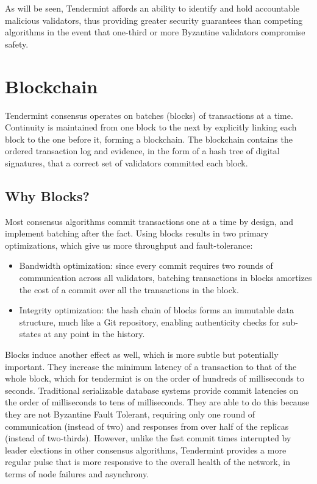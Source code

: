As will be seen, Tendermint affords an ability to identify and hold accountable malicious validators, thus providing greater security guarantees than competing algorithms in the event that one-third or more Byzantine validators compromise safety.

\section{Blockchain}

Tendermint consensus operates on batches (blocks) of transactions at a time.
Continuity is maintained from one block to the next by explicitly linking each block to the one before it,
forming a blockchain. 
The blockchain contains the ordered transaction log and evidence,
in the form of a hash tree of digital signatures,
that a correct set of validators committed each block.

\subsection{Why Blocks?}
Most consensus algorithms commit transactions one at a time by design, and implement batching after the fact.
Using blocks results in two primary optimizations, which give us more throughput and fault-tolerance:

\begin{itemize}
\item{Bandwidth optimization: since every commit requires two rounds of communication across all validators, 
	batching transactions in blocks amortizes the cost of a commit over all the transactions in the block.}
\item{Integrity optimization: the hash chain of blocks forms an immutable data structure, much like a Git repository, enabling authenticity checks for sub-states at any point in the history.}
\end{itemize}

Blocks induce another effect as well, which is more subtle but potentially important. 
They increase the minimum latency of a transaction to that of the whole block, which for tendermint is on the order of hundreds of milliseconds to seconds.
Traditional serializable database systems provide commit latencies on the order of milliseconds to tens of milliseconds.
They are able to do this because they are not Byzantine Fault Tolerant, requiring only one round of communication (instead of two)
and responses from over half of the replicas (instead of two-thirds).
However, unlike the fast commit times interupted by leader elections in other consensus algorithms,
Tendermint provides a more regular pulse that is more responsive to the overall health of the network, in terms of node failures and asynchrony.

